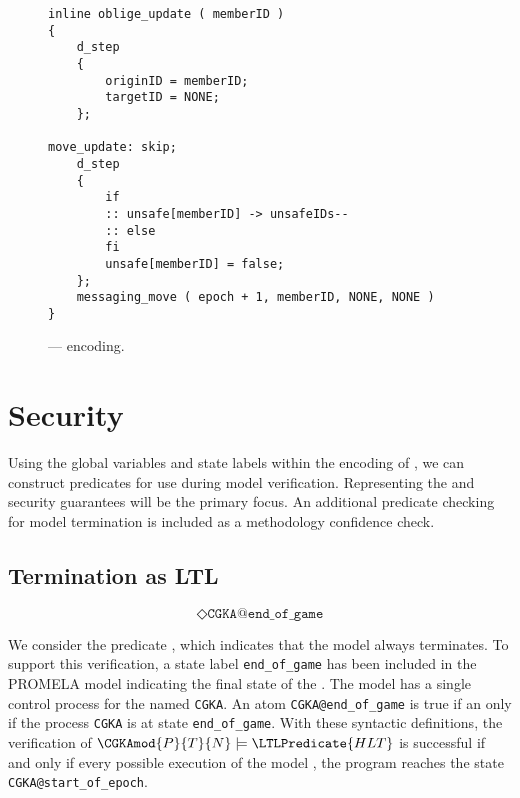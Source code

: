 \begin{figure}[h!]
  \centering
  \caption{\label{fig:Oracle-Update}\CGKAmod{}{}{} ---  encoding.}
\begin{verbatim}
inline oblige_update ( memberID )
{
    d_step
    {
        originID = memberID;
        targetID = NONE;
    };

move_update: skip;
    d_step
    {
        if
        :: unsafe[memberID] -> unsafeIDs--
        :: else
        fi
        unsafe[memberID] = false;
    };
    messaging_move ( epoch + 1, memberID, NONE, NONE )
}
\end{verbatim}
\end{figure}


\hypertarget{sec:LTL-security}{%
\section{Security}\label{sec:LTL-security}}

Using the global variables and state labels within the encoding of , we can construct  predicates for use during model verification.
Representing the  and  security guarantees will be the primary focus.
An additional predicate checking for model termination is included as a methodology confidence check.


\hypertarget{hlt-as-ltl}{%
\subsection{Termination as LTL}\label{hlt-as-ltl}}

\begin{LTL}
    $$
    \Diamond \texttt{CGKA@end\_of\_game}
    $$
\end{LTL}

We consider the  predicate , which indicates that the  model always terminates.
To support this verification, a state label \texttt{end\_of\_game} has been included in the PROMELA model indicating the final state of the \CGKAsec. 
The model has a single control process for the \CGKAsec named \texttt{CGKA}.
An  atom \texttt{CGKA@end\_of\_game} is true if an only if the process \texttt{CGKA} is at state \texttt{end\_of\_game}.
With these syntactic definitions, the verification of \(\CGKAmod{P}{T}{N} \models \LTLPredicate{HLT} \) is successful if and only if every possible execution of the model \CGKAmod{}{}{}, the program reaches the state \texttt{CGKA@start\_of\_epoch}.


